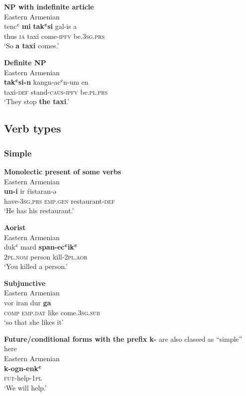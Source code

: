 \documentclass[output=paper,colorlinks,citecolor=brown,draftmode]{langscibook}
\begin{document}
\ea\label{Armenian:ex:9}
\textbf{NP with indefinite article} \\
Eastern Armenian  \\
\gll tencʿ \textbf{mi} \textbf{takʿsi} gal-is a \\
thus \textsc{ia} taxi come\textsc{-ipfv} be\textsc{.3sg.prs} \\
\glt `So \textbf{a taxi} comes.'
\z

\ea\label{Armenian:ex:10}
\textbf{Definite NP} \\
Eastern Armenian  \\
\gll \textbf{takʿsi-n} kangn-acʿn-um en  \\
taxi\textsc{-def} stand\textsc{-caus-ipfv} be\textsc{.pl.prs} \\
\glt `They stop \textbf{the taxi}.'
\z


\subsection{Verb types}
\subsubsection{Simple}

\ea\label{Armenian:ex:11}
\textbf{Monolectic present of some verbs} \\
Eastern Armenian  \\
\gll \textbf{un-i} ir ŕistaran-ə  \\
have\textsc{-3sg.prs} \textsc{emp.gen} restaurant\textsc{-def} \\
\glt `He has his restaurant.'
\z

\ea\label{Armenian:ex:12}
\textbf{Aorist} \\
Eastern Armenian  \\
\gll dukʿ mard \textbf{span-ecʿikʿ}  \\
\textsc{2pl.nom} person kill\textsc{-2pl.aor} \\
\glt `You killed a person.' 
\z

\ea\label{Armenian:ex:13}
\textbf{Subjunctive} \\
Eastern Armenian  \\
\gll vor iran dur \textbf{ga}  \\
\textsc{comp} \textsc{emp.dat} like come\textsc{.3sg.sub} \\
\glt `so that she likes it' 
\z

\ea\label{Armenian:ex:14}
\textbf{Future/conditional forms with the prefix k-}  are also classed as ``simple'' here \\
Eastern Armenian  \\
\gll \textbf{k-ogn-enkʿ}  \\
 \textsc{fut-}help\textsc{-1pl} \\
\glt `We will help.' 
\z
\end{document}

